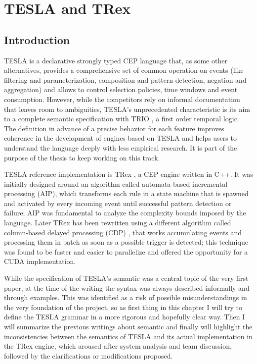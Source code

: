 \chapter{TESLA and TRex}

\section{Introduction}

TESLA \cite{tesla} is a declarative strongly typed CEP language that, as some other alternatives, provides a comprehensive set of common operation on events (like filtering and parameterization, composition and pattern detection, negation and aggregation) and allows to control selection policies, time windows and event consumption. However, while the competitors rely on informal documentation that leaves room to ambiguities, TESLA's unprecedented characteristic is its aim to a complete semantic specification with TRIO \cite{trio}, a first order temporal logic. The definition in advance of a precise behavior for each feature improves coherence in the development of engines based on TESLA and helps users to understand the language deeply with less empirical research. It is part of the purpose of the thesis to keep working on this track.

TESLA reference implementation is TRex \cite{trex}, a CEP engine written in C++. It was initially designed around an algorithm called automata-based incremental processing (AIP), which transforms each rule in a state machine that is spawned and activated by every incoming event until successful pattern detection or failure; AIP was fundamental to analyze the complexity bounds imposed by the language. Later TRex has been rewritten using a different algorithm called column-based delayed processing (CDP) \cite{trex-cuda}, that works accumulating events and processing them in batch as soon as a possible trigger is detected; this technique was found to be faster and easier to parallelize and offered the opportunity for a CUDA implementation.

While the specification of TESLA's semantic was a central topic of the very first paper, at the time of the writing the syntax was always described informally and through examples. This was identified as a risk of possible misunderstandings in the very foundation of the project, so as first thing in this chapter I will try to define the TESLA grammar in a more rigorous and hopefully clear way. Then I will summarize the previous writings about semantic and finally will highlight the inconsistencies between the semantics of TESLA and its actual implementation in the TRex engine, which aroused after system analysis and team discussion, followed by the clarifications or modifications proposed.

